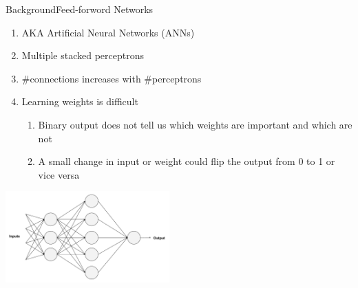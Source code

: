 \documentclass[handout]{beamer}
\begin{document}
\begin{frame}{Background}{Feed-forword Networks}
\begin{enumerate}
  \item AKA Artificial Neural Networks (ANNs) \\

  \item Multiple stacked perceptrons \\

  \item \#connections increases with \#perceptrons \\

  \item Learning weights is difficult
    \begin{enumerate}
      \item Binary output does not tell us which weights are important and which are not \\
      \item A small change in input or weight could flip the output from 0 to 1 or vice versa \\
    \end{enumerate}
\end{enumerate}
    \begin{center}
      \includegraphics[width=0.65\linewidth, height=3.5cm]{images/anns}
    \end{center}
\end{frame}
\end{document}
